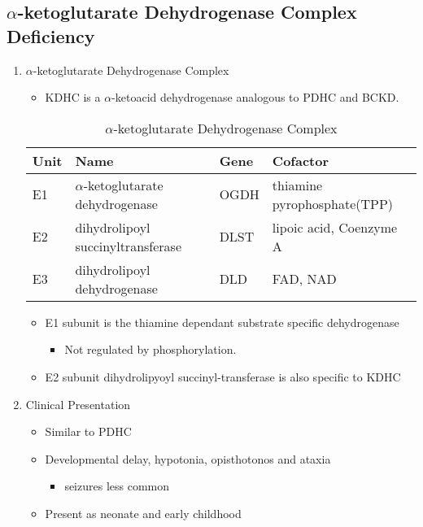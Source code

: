 \documentclass{scrartcl}
\begin{document}
\subsection{\(\alpha\)-ketoglutarate Dehydrogenase Complex Deficiency}
\label{sec:org7a0aac2}
\begin{enumerate}
\item \(\alpha\)-ketoglutarate Dehydrogenase Complex
\label{sec:org979215c}
\begin{itemize}
\item KDHC is a \(\alpha\)-ketoacid dehydrogenase analogous to PDHC and BCKD.
\end{itemize}


\begin{table}[htbp]
\caption{\label{tab:org91ac1ad}
\(\alpha\)-ketoglutarate Dehydrogenase Complex}
\centering
\begin{tabular}{llll}
Unit & Name & Gene & Cofactor\\
\hline
E1 & \(\alpha\)-ketoglutarate dehydrogenase & OGDH & thiamine pyrophosphate(TPP)\\
E2 & dihydrolipoyl succinyltransferase & DLST & lipoic acid, Coenzyme A\\
E3 & dihydrolipoyl dehydrogenase & DLD & FAD, NAD\\
\end{tabular}
\end{table}

\begin{itemize}
\item E1 subunit is the thiamine dependant substrate specific dehydrogenase
\begin{itemize}
\item Not regulated by phosphorylation.
\end{itemize}
\item E2 subunit dihydrolipyoyl succinyl-transferase is also specific to KDHC
\end{itemize}

\item Clinical Presentation
\label{sec:orgdb8e228}
\begin{itemize}
\item Similar to PDHC
\item Developmental delay, hypotonia, opisthotonos and ataxia
\begin{itemize}
\item seizures less common
\end{itemize}
\item Present as neonate and early childhood
\end{itemize}


\end{enumerate}
\end{document}
